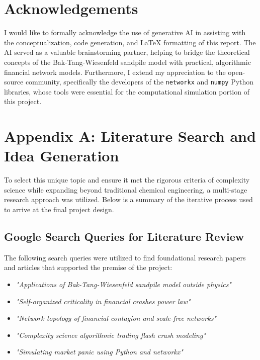 \documentclass[final,5p,times,twocolumn,authoryear]{elsarticle}
\begin{document}
\section*{Acknowledgements}
\label{sec:acknowledgements}
I would like to formally acknowledge the use of generative AI in assisting with the conceptualization, code generation, and LaTeX formatting of this report. The AI served as a valuable brainstorming partner, helping to bridge the theoretical concepts of the Bak-Tang-Wiesenfeld sandpile model with practical, algorithmic financial network models. Furthermore, I extend my appreciation to the open-source community, specifically the developers of the \texttt{networkx} and \texttt{numpy} Python libraries, whose tools were essential for the computational simulation portion of this project.

\section{Appendix A: Literature Search and Idea Generation}
\label{sec:appendix}
To select this unique topic and ensure it met the rigorous criteria of complexity science while expanding beyond traditional chemical engineering, a multi-stage research approach was utilized. Below is a summary of the iterative process used to arrive at the final project design.

\subsection{Google Search Queries for Literature Review}
The following search queries were utilized to find foundational research papers and articles that supported the premise of the project:
\begin{itemize}
    \item \textit{"Applications of Bak-Tang-Wiesenfeld sandpile model outside physics"}
    \item \textit{"Self-organized criticality in financial crashes power law"}
    \item \textit{"Network topology of financial contagion and scale-free networks"}
    \item \textit{"Complexity science algorithmic trading flash crash modeling"}
    \item \textit{"Simulating market panic using Python and networkx"}
\end{itemize}
\end{document}
